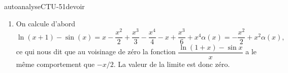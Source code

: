
\begin{corrige}{autoanalyseCTU-51devoir}

 
 
   \begin{enumerate}
   \item On calcule d'abord  
\[
\ln(x+1)-\sin(x) =x -\frac{x^2}{2} + \frac{x^3}{3} -\frac{x^4}{4} - x+\frac{x^3}{6} + x^4\alpha(x)= -\frac{x^2}{2}+  x^2\alpha(x),
\]
ce qui nous dit que au voisinage de zéro la fonction $\displaystyle \dfrac{\ln(1+x)-\sin x}{x}$ a le m\^eme comportement que $-x/2$. La valeur de la limite est donc zéro. 

   \end{enumerate}



\end{corrige}   
